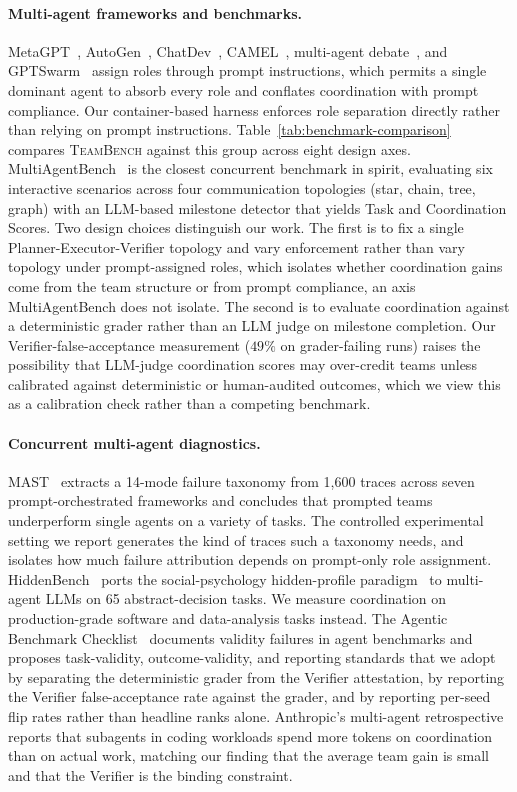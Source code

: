 \documentclass{article}
\begin{document}
\paragraph{Multi-agent frameworks and benchmarks.}
MetaGPT~\citep{hong2024metagpt}, AutoGen~\citep{wu2023autogen}, ChatDev~\citep{qian2024chatdev}, CAMEL~\citep{li2023camel}, multi-agent debate~\citep{du2024debate}, and GPTSwarm~\citep{zhuge2024gptswarm} assign roles through prompt instructions, which permits a single dominant agent to absorb every role and conflates coordination with prompt compliance. Our container-based harness enforces role separation directly rather than relying on prompt instructions. Table~\ref{tab:benchmark-comparison} compares \textsc{TeamBench} against this group across eight design axes. MultiAgentBench~\citep{zhu2025multiagentbench} is the closest concurrent benchmark in spirit, evaluating six interactive scenarios across four communication topologies (star, chain, tree, graph) with an LLM-based milestone detector that yields Task and Coordination Scores. Two design choices distinguish our work. The first is to fix a single Planner-Executor-Verifier topology and vary enforcement rather than vary topology under prompt-assigned roles, which isolates whether coordination gains come from the team structure or from prompt compliance, an axis MultiAgentBench does not isolate. The second is to evaluate coordination against a deterministic grader rather than an LLM judge on milestone completion. Our Verifier-false-acceptance measurement ($49\%$ on grader-failing runs) raises the possibility that LLM-judge coordination scores may over-credit teams unless calibrated against deterministic or human-audited outcomes, which we view this as a calibration check rather than a competing benchmark.

\paragraph{Concurrent multi-agent diagnostics.}
MAST~\citep{cemri2025whyfail} extracts a 14-mode failure taxonomy from 1{,}600 traces across seven prompt-orchestrated frameworks and concludes that prompted teams underperform single agents on a variety of tasks. The controlled experimental setting we report generates the kind of traces such a taxonomy needs, and isolates how much failure attribution depends on prompt-only role assignment. HiddenBench~\citep{li2025hiddenbench} ports the social-psychology hidden-profile paradigm~\citep{stasser1985pooling} to multi-agent LLMs on 65 abstract-decision tasks. We measure coordination on production-grade software and data-analysis tasks instead. The Agentic Benchmark Checklist~\citep{zhu2025abc} documents validity failures in agent benchmarks and proposes task-validity, outcome-validity, and reporting standards that we adopt by separating the deterministic grader from the Verifier attestation, by reporting the Verifier false-acceptance rate against the grader, and by reporting per-seed flip rates rather than headline ranks alone. Anthropic's multi-agent retrospective~\citep{anthropic2025multiagent} reports that subagents in coding workloads spend more tokens on coordination than on actual work, matching our finding that the average team gain is small and that the Verifier is the binding constraint.
\end{document}

